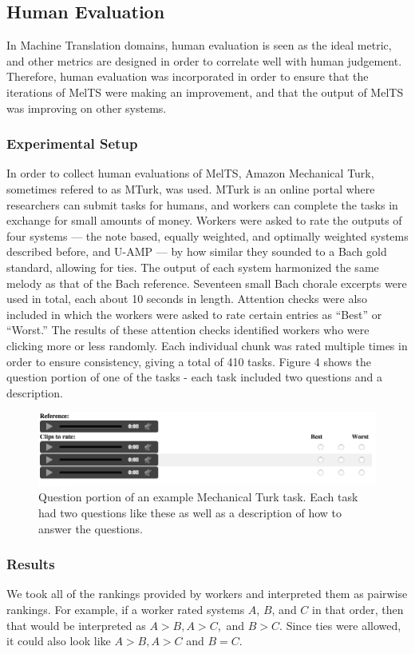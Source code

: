 \documentclass{sig-alternate}
\begin{document}
\subsection{Human Evaluation}
In Machine Translation domains, human evaluation is seen as the ideal metric, and other metrics are designed in order to correlate well with human judgement. Therefore, human evaluation was incorporated in order to ensure that the iterations of MelTS were making an improvement, and that the output of MelTS was improving on other systems.
\subsubsection{Experimental Setup}
In order to collect human evaluations of MelTS, Amazon Mechanical Turk, sometimes refered to as MTurk, was used. MTurk is an online portal where researchers can submit tasks for humans, and workers can complete the tasks in exchange for small amounts of money. Workers were asked to rate the outputs of four systems --- the note based, equally weighted, and optimally weighted systems described before, and U-AMP \cite{UAMP} --- by how similar they sounded to a Bach gold standard, allowing for ties. The output of each system harmonized the same melody as that of the Bach reference. Seventeen small Bach chorale excerpts were used in total, each about 10 seconds in length. Attention checks were also included in which the workers were asked to rate certain entries as ``Best'' or ``Worst.'' The results of these attention checks identified workers who were clicking more or less randomly. Each individual chunk was rated multiple times in order to ensure consistency, giving a total of 410 tasks. Figure 4 shows the question portion of one of the tasks - each task included two questions and a description.

\begin{figure}
\includegraphics[scale=0.3]{images/mturk_task}
\caption{Question portion of an example Mechanical Turk task. Each task had two questions like these as well as a description of how to answer the questions.}
\end{figure}

\subsubsection{Results}
We took all of the rankings provided by workers and interpreted them as pairwise rankings. For example, if a worker rated systems $A$, $B$, and $C$ in that order, then that would be interpreted as $A>B, A>C,$ and $B>C$. Since ties were allowed, it could also look like $A>B, A>C$ and $B=C$. 
\end{document}
